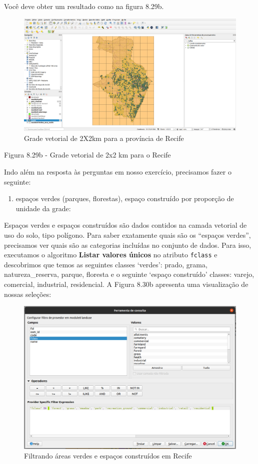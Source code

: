 \documentclass[
]{book}
\providecommand{\tightlist}{%
  \setlength{\itemsep}{0pt}\setlength{\parskip}{0pt}}
\begin{document}
Você deve obter um resultado como na figura 8.29b.

\begin{figure}
\centering
\includegraphics{media/modulo8/fig829_b.png}
\caption{Grade vetorial de 2X2km para a província de Recife}
\end{figure}

Figura 8.29b - Grade vetorial de 2x2 km para o Recife

Indo além na resposta às perguntas em nosso exercício, precisamos fazer o seguinte:

\begin{enumerate}
\def\labelenumi{\arabic{enumi}.}
\tightlist
\item
  espaços verdes (parques, florestas), espaço construído por proporção de unidade da grade:
\end{enumerate}

Espaços verdes e espaços construídos são dados contidos na camada vetorial de uso do solo, tipo polígono. Para saber exatamente quais são os ``espaços verdes'', precisamos ver quais são as categorias incluídas no conjunto de dados. Para isso, executamos o algoritmo \textbf{Listar valores únicos} no atributo \texttt{fclass} e descobrimos que temos as seguintes classes `verdes': prado, grama, natureza\_reserva, parque, floresta e o seguinte `espaço construído' classes: varejo, comercial, industrial, residencial. A Figura 8.30b apresenta uma visualização de nossas seleções:

\begin{figure}
\centering
\includegraphics{media/modulo8/fig830_a.png}
\caption{Filtrando áreas verdes e espaços construídos em Recife}
\end{figure}
\end{document}
